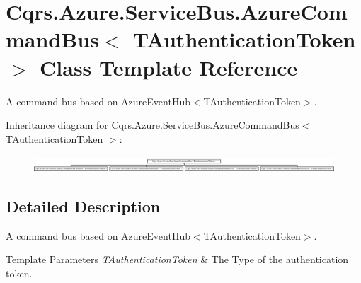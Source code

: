 \hypertarget{classCqrs_1_1Azure_1_1ServiceBus_1_1AzureCommandBus}{}\section{Cqrs.\+Azure.\+Service\+Bus.\+Azure\+Command\+Bus$<$ T\+Authentication\+Token $>$ Class Template Reference}
\label{classCqrs_1_1Azure_1_1ServiceBus_1_1AzureCommandBus}


A command bus based on Azure\+Event\+Hub$<$\+T\+Authentication\+Token$>$.  


Inheritance diagram for Cqrs.\+Azure.\+Service\+Bus.\+Azure\+Command\+Bus$<$ T\+Authentication\+Token $>$\+:\begin{figure}[H]
\begin{center}
\leavevmode
\includegraphics[height=0.602151cm]{classCqrs_1_1Azure_1_1ServiceBus_1_1AzureCommandBus}
\end{center}
\end{figure}


\subsection{Detailed Description}
A command bus based on Azure\+Event\+Hub$<$\+T\+Authentication\+Token$>$. 


\begin{DoxyTemplParams}{Template Parameters}
{\em T\+Authentication\+Token} & The Type of the authentication token.\\
\hline
\end{DoxyTemplParams}
